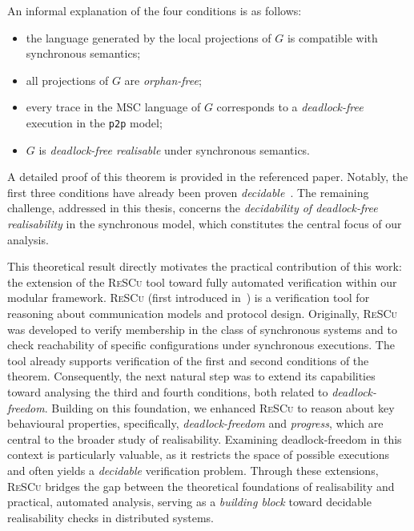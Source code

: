 An informal explanation of the four conditions is as follows:
\begin{itemize}
  \item the language generated by the local projections of $G$ is compatible
  with synchronous semantics;
  \item all projections of $G$ are \emph{orphan-free};
  \item every trace in the MSC language of $G$ corresponds to a 
  \emph{deadlock-free} execution in the \verb|p2p| model;
  \item $G$ is \emph{deadlock-free realisable} under synchronous semantics.
\end{itemize}
A detailed proof of this theorem is provided in the referenced paper.  
Notably, the first three conditions have already been proven 
\emph{decidable}~\cite{guizouarn2023communicating,di2025realisability}.  
The remaining challenge, addressed in this thesis, concerns the 
\emph{decidability of deadlock-free realisability} in the synchronous model, 
which constitutes the central focus of our analysis.

This theoretical result directly motivates the practical contribution of
this work: the extension of the \textsc{ReSCu} tool toward fully
automated verification within our modular framework.  
\textsc{ReSCu} (first introduced
in~\cite{desgeorges2023rsc,di2023multiparty,guizouarn2023communicating})
is a verification tool for reasoning about communication models and
protocol design.  
Originally, \textsc{ReSCu} was developed to verify membership in the
class of synchronous systems and to check reachability of specific
configurations under synchronous executions.  
The tool already supports verification of the first and second
conditions of the theorem.  
Consequently, the next natural step was to extend its capabilities
toward analysing the third and fourth conditions, both related to
\emph{deadlock-freedom}.  
Building on this foundation, we enhanced \textsc{ReSCu} to reason about
key behavioural properties, specifically, \textit{deadlock-freedom} and
\textit{progress}, which are central to the broader study of
realisability.
Examining deadlock-freedom in this context is particularly valuable, as
it restricts the space of possible executions and often yields a
\emph{decidable} verification problem.  
Through these extensions, \textsc{ReSCu} bridges the gap between the
theoretical foundations of realisability and practical, automated
analysis, serving as a \emph{building block} toward decidable
realisability checks in distributed systems.

